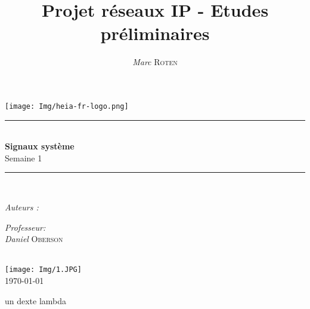

\title{Projet réseaux IP - Etudes préliminaires} 
\author{\textsl{Marc} \textsc{Roten}}
\date{}


    \begin{titlepage}
        \begin{center}
            \texttt{[image: Img/heia-fr-logo.png]}\\[1.3cm]
            
            \rule{\linewidth}{0.3mm} \\[0.3cm]
            {\huge \bfseries Signaux système \\[0.5cm]} 
            {\Large  Semaine 1 }
            \rule{\linewidth}{0.3mm} \\[0.8cm]
            \noindent
            \begin{minipage}[t]{0.4\textwidth}
                \begin{flushleft} \large
                    \emph{Auteurs :}\\
                    \theauthor
                \end{flushleft}
            \end{minipage}
            \begin{minipage}[t]{0.4\textwidth} 
                \begin{flushright} \large
                    \emph{Professeur:}\\
                    \textsl{Daniel} \textsc{ Oberson}\\ 
                \end{flushright} 
                \vfill
            \end{minipage}\\[1.3cm]
            \texttt{[image: Img/1.JPG]}\\[1.5cm]
            \vspace*{1\baselineskip}
            \today \\[0.7cm]
        \end{center}
    \end{titlepage}
    \tableofcontents
    \clearpage

\begin{cisco}
   un dexte lambda
\end{cisco}
   
